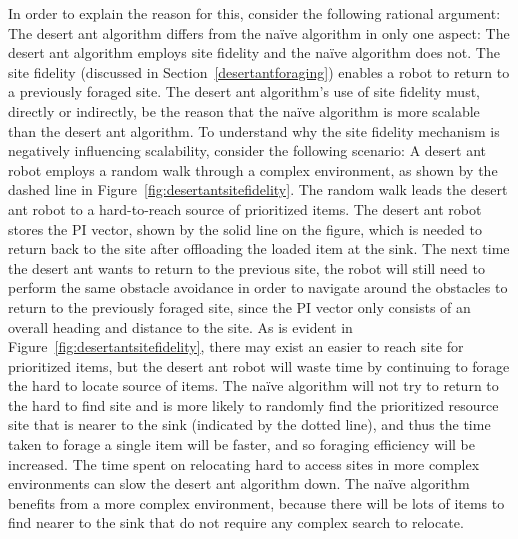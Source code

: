 \documentclass[preprint,12pt]{elsarticle}
\begin{document}
In order to explain the reason for this, consider the following rational argument: The desert ant algorithm differs from the na\"ive algorithm in only one aspect: The desert ant algorithm employs site fidelity and the na\"ive algorithm does not. The site fidelity (discussed in Section~\ref{desertantforaging}) enables a robot to return to a previously foraged site. The desert ant algorithm's use of site fidelity must, directly or indirectly, be the reason that the na\"ive algorithm is more scalable than the desert ant algorithm. To understand why the site fidelity mechanism is negatively influencing scalability, consider the following scenario: A desert ant robot employs a random walk through a complex environment, as shown by the dashed line in Figure~\ref{fig:desertantsitefidelity}. The random walk leads the desert ant robot to a hard-to-reach source of prioritized items. The desert ant robot stores the PI vector, shown by the solid line on the figure, which is needed to return back to the site after offloading the loaded item at the sink. The next time the desert ant wants to return to the previous site, the robot will still need to perform the same obstacle avoidance in order to navigate around the obstacles to return to the previously foraged site, since the PI vector only consists of an overall heading and distance to the site. As is evident in Figure~\ref{fig:desertantsitefidelity}, there may exist an easier to reach site for prioritized items, but the desert ant robot will waste time by continuing to forage the hard to locate source of items. The na\"ive algorithm will not try to return to the hard to find site and is more likely to randomly find the prioritized resource site that is nearer to the sink (indicated by the dotted line), and thus the time taken to forage a single item will be faster, and so foraging efficiency will be increased. The time spent on relocating hard to access sites in more complex environments can slow the desert ant algorithm down. The na\"ive algorithm benefits from a more complex environment, because there will be lots of items to find nearer to the sink that do not require any complex search to relocate. 
\end{document}
